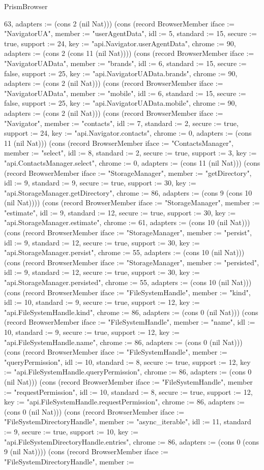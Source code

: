 \begin{lexlean}{PrismBrowser}
\begin{semanticmodule}
{63, adapters := (cons 2 (nil Nat))}) (cons (record BrowserMember {iface := "NavigatorUA", member := "userAgentData", idl := 5, standard := 15, secure := true, support := 24, key := "api.Navigator.userAgentData", chrome := 90, adapters := (cons 2 (cons 11 (nil Nat)))}) (cons (record BrowserMember {iface := "NavigatorUAData", member := "brands", idl := 6, standard := 15, secure := false, support := 25, key := "api.NavigatorUAData.brands", chrome := 90, adapters := (cons 2 (nil Nat))}) (cons (record BrowserMember {iface := "NavigatorUAData", member := "mobile", idl := 6, standard := 15, secure := false, support := 25, key := "api.NavigatorUAData.mobile", chrome := 90, adapters := (cons 2 (nil Nat))}) (cons (record BrowserMember {iface := "Navigator", member := "contacts", idl := 7, standard := 2, secure := true, support := 24, key := "api.Navigator.contacts", chrome := 0, adapters := (cons 11 (nil Nat))}) (cons (record BrowserMember {iface := "ContactsManager", member := "select", idl := 8, standard := 2, secure := true, support := 3, key := "api.ContactsManager.select", chrome := 0, adapters := (cons 11 (nil Nat))}) (cons (record BrowserMember {iface := "StorageManager", member := "getDirectory", idl := 9, standard := 9, secure := true, support := 30, key := "api.StorageManager.getDirectory", chrome := 86, adapters := (cons 9 (cons 10 (nil Nat)))}) (cons (record BrowserMember {iface := "StorageManager", member := "estimate", idl := 9, standard := 12, secure := true, support := 30, key := "api.StorageManager.estimate", chrome := 61, adapters := (cons 10 (nil Nat))}) (cons (record BrowserMember {iface := "StorageManager", member := "persist", idl := 9, standard := 12, secure := true, support := 30, key := "api.StorageManager.persist", chrome := 55, adapters := (cons 10 (nil Nat))}) (cons (record BrowserMember {iface := "StorageManager", member := "persisted", idl := 9, standard := 12, secure := true, support := 30, key := "api.StorageManager.persisted", chrome := 55, adapters := (cons 10 (nil Nat))}) (cons (record BrowserMember {iface := "FileSystemHandle", member := "kind", idl := 10, standard := 9, secure := true, support := 12, key := "api.FileSystemHandle.kind", chrome := 86, adapters := (cons 0 (nil Nat))}) (cons (record BrowserMember {iface := "FileSystemHandle", member := "name", idl := 10, standard := 9, secure := true, support := 12, key := "api.FileSystemHandle.name", chrome := 86, adapters := (cons 0 (nil Nat))}) (cons (record BrowserMember {iface := "FileSystemHandle", member := "queryPermission", idl := 10, standard := 8, secure := true, support := 12, key := "api.FileSystemHandle.queryPermission", chrome := 86, adapters := (cons 0 (nil Nat))}) (cons (record BrowserMember {iface := "FileSystemHandle", member := "requestPermission", idl := 10, standard := 8, secure := true, support := 12, key := "api.FileSystemHandle.requestPermission", chrome := 86, adapters := (cons 0 (nil Nat))}) (cons (record BrowserMember {iface := "FileSystemDirectoryHandle", member := "async_iterable", idl := 11, standard := 9, secure := true, support := 10, key := "api.FileSystemDirectoryHandle.entries", chrome := 86, adapters := (cons 0 (cons 9 (nil Nat)))}) (cons (record BrowserMember {iface := "FileSystemDirectoryHandle", member := }
\end{semanticmodule}
\end{lexlean}
